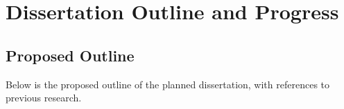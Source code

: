 

% 

% 

% 

\chapter{Dissertation Outline and Progress}
\label{chap:thesis}
\section{Proposed Outline}
Below is the proposed outline of the planned dissertation, with references to previous research.

